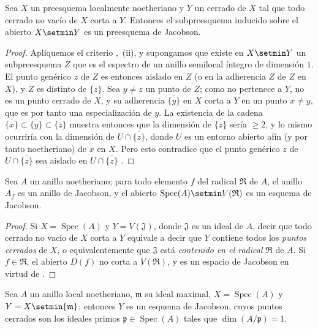 \begin{proposition}[10.5.7]
\label{IV.10.5.7}
Sea $X$ un preesquema localmente noetheriano y $Y$ un cerrado de $X$ tal que todo cerrado no vacío de $X$ corta a $Y$.
Entonces el subpreesquema inducido sobre el abierto $X\setmin Y$ es un preesquema de Jacobson.
\end{proposition}

\begin{proof}
Apliquemos el criterio ,~(ii), y supongamos que existe en $X\setmin Y$ un subpreesquema $Z$ que es el espectro de un anillo semilocal íntegro de dimensión $1$. El punto genérico $z$ de $Z$ es entonces aislado en $Z$ (o en la adherencia $\overline{Z}$ de $Z$ en $X$), y $Z$ es distinto de $\{z\}$.
Sea $y\neq z$ un punto de $Z$; como no pertenece a $Y$, no es un punto cerrado de $X$, y su adherencia $\overline{\{y\}}$ en $X$ corta a $Y$ en un punto $x\neq y$, que es por tanto una especialización de $y$.
La existencia de la cadena $\overline{\{x\}}\subset\overline{\{y\}}\subset\overline{\{z\}}$ muestra entonces que la dimensión de $\overline{\{z\}}$ sería $\geq 2$, y lo mismo ocurriría con la dimensión de $U\cap\overline{\{z\}}$, donde $U$ es un entorno abierto afín (y por tanto noetheriano) de $x$ en $X$.
Pero esto contradice que el punto genérico $z$ de $U\cap\overline{\{z\}}$ sea aislado en $U\cap\overline{\{z\}}$ .
\end{proof}

\begin{corollary}[10.5.8]
\label{IV.10.5.8}
Sea $A$ un anillo noetheriano; para todo elemento $f$ del radical $\mathfrak{R}$ de $A$, el anillo $A_f$ es un anillo de Jacobson, y el abierto $\operatorname{Spec}(A)\setmin V(\mathfrak{R})$ es un esquema de Jacobson.
\end{corollary}

\begin{proof}
Si $X=\operatorname{Spec}(A)$ y $Y=V(\mathfrak{J})$, donde $\mathfrak{J}$ es un ideal de $A$, decir que todo cerrado no vacío de $X$ corta a $Y$ equivale  a decir que $Y$ contiene todos los \emph{puntos cerrados} de $X$, o equivalentemente que $\mathfrak{J}$ está \emph{contenido en el radical} $\mathfrak{R}$ de $A$.
Si $f\in\mathfrak{R}$, el abierto $D(f)$ no corta a $V(\mathfrak{R})$, y es un espacio de Jacobson en virtud de .
\end{proof}

\begin{corollary}[10.5.9]
\label{IV.10.5.9}
Sea $A$ un anillo local noetheriano, $\mathfrak{m}$ su ideal maximal, $X=\operatorname{Spec}(A)$ y $Y=X\setmin\{\mathfrak{m}\}$; entonces $Y$ es un esquema de Jacobson, cuyos puntos cerrados son los ideales primos $\mathfrak{p}\in\operatorname{Spec}(A)$ tales que $\dim(A/\mathfrak{p})=1$.
\end{corollary}

